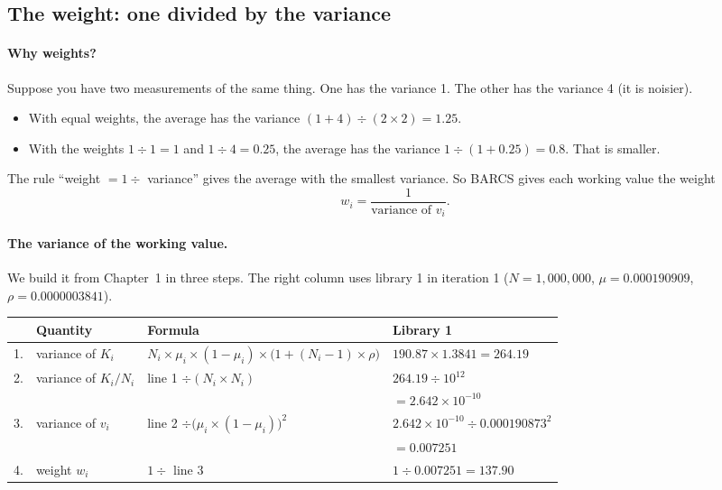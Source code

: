 \subsection{The weight: one divided by the variance}

\paragraph{Why weights?} Suppose you have two measurements of the same
thing. One has the variance 1. The other has the variance 4 (it is noisier).
\begin{itemize}
\item With equal weights, the average has the variance
  $(1 + 4) \div (2 \times 2) = 1.25$.
\item With the weights $1 \div 1 = 1$ and $1 \div 4 = 0.25$, the average has
  the variance $1 \div (1 + 0.25) = 0.8$. That is smaller.
\end{itemize}
The rule ``weight $= 1 \div$ variance'' gives the average with the smallest
variance. So BARCS gives each working value the weight
\[
w_i = \frac{1}{\text{variance of } v_i} .
\]

\paragraph{The variance of the working value.} We build it from Chapter~1
in three steps. The right column uses library 1 in iteration 1
($N = 1{,}000{,}000$, $\mu = 0.000190909$, $\rho = 0.0000003841$).

\begin{center}
\small
\renewcommand{\arraystretch}{1.45}\setlength{\tabcolsep}{4pt}
\begin{tabular}{@{}r@{\;}l l l@{}}
\toprule
& \textbf{Quantity} & \textbf{Formula} & \textbf{Library 1}\\
\midrule
1. & variance of $K_i$ & $N_i \times \mu_i \times (1-\mu_i) \times \bigl(1 + (N_i-1) \times \rho\bigr)$ & $190.87 \times 1.3841 = 264.19$\\
2. & variance of $K_i / N_i$ & line 1 $\div (N_i \times N_i)$ & $264.19 \div 10^{12}$\\ & & & $= 2.642 \times 10^{-10}$\\
3. & variance of $v_i$ & line 2 $\div \bigl(\mu_i \times (1-\mu_i)\bigr)^2$ & $2.642 \times 10^{-10} \div 0.000190873^2$\\ & & & $= 0.007251$\\
4. & weight $w_i$ & $1 \div$ line 3 & $1 \div 0.007251 = 137.90$\\
\bottomrule
\end{tabular}
\end{center}

